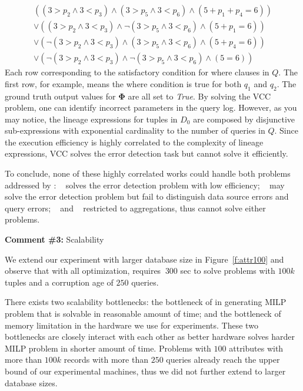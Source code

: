 {\small
\begin{eqnarray*}
&((3 > p_2 \wedge 3 < p_3) \wedge (3 > p_5 \wedge 3 < p_6) \wedge (5 + p_1+p_4 = 6)) &\\
&\vee ((3 > p_2 \wedge 3 < p_3) \wedge \neg(3 > p_5 \wedge 3 < p_6) \wedge (5 + p_1= 6))& \\
&\vee (\neg(3 > p_2 \wedge 3 < p_3) \wedge (3 > p_5 \wedge 3 < p_6) \wedge (5 + p_4= 6))& \\
&\vee (\neg(3 > p_2 \wedge 3 < p_3) \wedge \neg(3 > p_5 \wedge 3 < p_6) \wedge (5 = 6))&
\end{eqnarray*}
}
Each row corresponding to the satisfactory condition for where clauses in $Q$.
The first row, for example, means the where condition is true for both $q_1$
and $q_2$. The ground truth output values for $\mathbf{\Phi}$ are all set to
\textit{True}. By solving the VCC problem, one can identify incorrect
parameters in the query log. However, as you may notice, the lineage
expressions for tuples in $D_0$ are composed by disjunctive sub-expressions
with exponential cardinality to the number of queries in $Q$. Since the
execution efficiency is highly correlated to the complexity of lineage
expressions, VCC solves the error detection task but cannot solve it
efficiently.

To conclude, none of these highly correlated works could handle both problems
addressed by \sys: ~\cite{meliou2011tracing} solves the error detection
problem with low efficiency; ~\cite{chalamalla2014} may solve the error
detection problem but fail to distinguish data source errors and query errors;
~\cite{Wu13} and ~\cite{roy2014formal} restricted to aggregations, thus cannot
solve either problems.


\comskip

\noindent
\textbf{Comment \#3:} Scalability 
\begin{quote}
\end{quote}

We extend our experiment with larger database size in Figure~\ref{f:attr100}
and observe that with all optimization, \sys requires $~300$ sec to solve
problems with $100k$ tuples and a corruption age of $250$ queries.

There exists two scalability bottlenecks: the bottleneck of \sys in generating MILP problem that is solvable in 
reasonable amount of time; and the bottleneck of memory limitation in the hardware we use for experiments. 
These two bottlenecks are closely interact with each other as better hardware solves harder MILP problem in 
shorter amount of time. Problems with $100$ attributes with more than $100k$ records with more than $250$ queries already 
reach the upper bound of our experimental machines, thus we did not further extend \sys to larger database sizes. 


